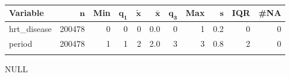 \begingroup\footnotesize
\begin{longtable}{lrrrrrrrrrr}
 \textbf{Variable} & $\mathbf{n}$ & \textbf{Min} & $\mathbf{q_1}$ & $\mathbf{\widetilde{x}}$ & $\mathbf{\bar{x}}$ & $\mathbf{q_3}$ & \textbf{Max} & $\mathbf{s}$ & \textbf{IQR} & \textbf{\#NA} \\ 
  \hline
hrt\_disease & 200478 & 0 & 0 & 0 & 0.0 & 0 & 1 & 0.2 & 0 & 0 \\ 
  period & 200478 & 1 & 1 & 2 & 2.0 & 3 & 3 & 0.8 & 2 & 0 \\ 
  \hline
\caption{} 
\label{}
\end{longtable}
\endgroup
NULL
